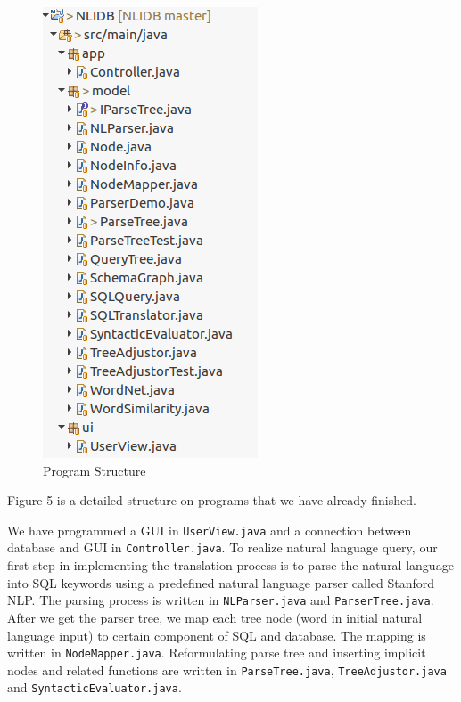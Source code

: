 \documentclass[twocolumn]{article}
\begin{document}
\begin{figure}[ht]
  \centering
  \includegraphics[width=0.8\linewidth]{figures/program_structure.png}
  \caption{Program Structure}
\end{figure}
  
Figure 5 is a detailed structure on programs that we have already finished.

We have programmed a GUI in \texttt{UserView.java} and a connection between database and GUI in \texttt{Controller.java}. To realize natural language query, our first step in implementing the translation process is to parse the natural language into SQL keywords using a predefined natural language parser called Stanford NLP. The parsing process is written in \texttt{NLParser.java} and \texttt{ParserTree.java}. After we get the parser tree, we map each tree node (word in initial natural language input) to certain component of SQL and database. The mapping is written in \texttt{NodeMapper.java}. Reformulating parse tree and inserting implicit nodes and related functions are written in \texttt{ParseTree.java}, \texttt{TreeAdjustor.java} and \texttt{SyntacticEvaluator.java}.
\end{document}

